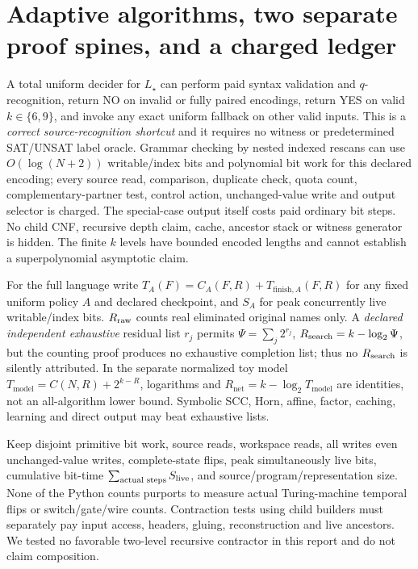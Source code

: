 \documentclass[11pt]{article}
\begin{document}
\section{Adaptive algorithms, two separate proof spines, and a charged ledger}
A total uniform decider for \(L_\star\) can perform paid syntax validation and \(q\)-recognition, return NO on invalid or fully paired encodings, return YES on valid \(k\in\{6,9\}\), and invoke any exact uniform fallback on other valid inputs. This is a \emph{correct source-recognition shortcut} and it requires no witness or predetermined SAT/UNSAT label oracle. Grammar checking by nested indexed rescans can use \(O(\log(N+2))\) writable/index bits and polynomial bit work for this declared encoding; every source read, comparison, duplicate check, quota count, complementary-partner test, control action, unchanged-value write and output selector is charged. The special-case output itself costs paid ordinary bit steps. No child CNF, recursive depth claim, cache, ancestor stack or witness generator is hidden. The finite \(k\) levels have bounded encoded lengths and cannot establish a superpolynomial asymptotic claim.

For the full language write \(T_A(F)=C_A(F,R)+T_{\mathrm{finish},A}(F,R)\) for any fixed uniform policy \(A\) and declared checkpoint, and \(S_A\) for peak concurrently live writable/index bits. \(R_{\rm raw}\) counts real eliminated original names only. A \emph{declared independent exhaustive} residual list \(r_j\) permits \(\Psi=\sum_j2^{r_j}\), \(R_{\rm search}=k-\log_2\Psi\), but the counting proof produces no exhaustive completion list; thus no \(R_{\rm search}\) is silently attributed. In the separate normalized toy model \(T_{\mathrm{model}}=C(N,R)+2^{k-R}\), logarithms and \(R_{\mathrm{net}}=k-\log_2T_{\mathrm{model}}\) are identities, not an all-algorithm lower bound. Symbolic SCC, Horn, affine, factor, caching, learning and direct output may beat exhaustive lists.

Keep disjoint primitive bit work, source reads, workspace reads, all writes even unchanged-value writes, complete-state flips, peak simultaneously live bits, cumulative bit-time \(\sum_{\text{actual steps}}S_{\rm live}\), and source/program/representation size. None of the Python counts purports to measure actual Turing-machine temporal flips or switch/gate/wire counts. Contraction tests using child builders must separately pay input access, headers, gluing, reconstruction and live ancestors. We tested no favorable two-level recursive contractor in this report and do not claim composition.
\end{document}
